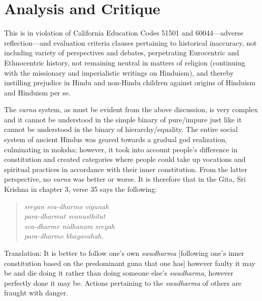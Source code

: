 \section*{Analysis and Critique} 

This is in violation of California Education Codes 51501 and 60044—adverse reflection—and evaluation criteria clauses pertaining to historical inaccuracy, not including variety of perspectives and debates, perpetrating Eurocentric and Ethnocentric history, not remaining neutral in matters of religion (continuing with the missionary and imperialistic writings on Hinduism), and thereby instilling prejudice in Hindu and non-Hindu children against origins of Hinduism and Hinduism per se.

The \textit{varna} system, as must be evident from the above discussion, is very complex and it cannot be understood in the simple binary of pure/impure just like it cannot be understood in the binary of hierarchy/equality. The entire social system of ancient Hindus was geared towards a gradual god realization, culminating in moksha; however, it took into account people’s difference in constitution and created categories where people could take up vocations and spiritual practices in accordance with their inner constitution. From the latter perspective, no \textit{varna} was better or worse. It is therefore that in the Gita, Sri Krishna in chapter 3, verse 35 says the following: 

\begin{quote}
\textit{sreyan sva-dharmo vigunah}\\
\textit{para-dharmat svanusthitat}\\
\textit{sva-dharme nidhanam sreyah}\\
\textit{para-dharmo bhayavahah.} 
\end{quote}
Translation: It is better to follow one’s own \textit{swadharma}  [following one’s inner constitution based on the predominant guna that one has] however faulty it may be and die doing it rather than doing someone else’s \textit{swadharma}, however perfectly done it may be. Actions pertaining to the \textit{swadharma} of others are fraught with danger. 

